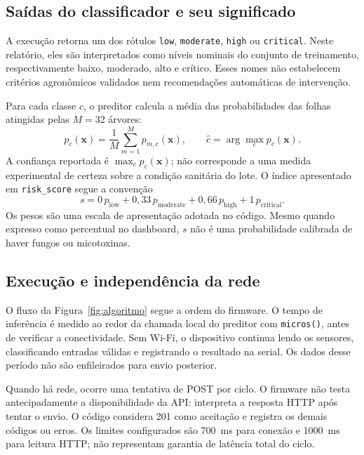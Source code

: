 \subsection{Saídas do classificador e seu significado}

A execução retorna um dos rótulos \texttt{low}, \texttt{moderate},
\texttt{high} ou \texttt{critical}. Neste relatório, eles são
interpretados como níveis nominais do conjunto de treinamento,
respectivamente baixo, moderado, alto e crítico.
Esses nomes não estabelecem critérios agronômicos validados nem
recomendações automáticas de intervenção.

Para cada classe $c$, o preditor calcula a média das probabilidades
das folhas atingidas pelas $M=32$ árvores:
\begin{equation}
p_c(\mathbf{x})=\frac{1}{M}\sum_{m=1}^{M}p_{m,c}(\mathbf{x}),
\qquad
\widehat{c}=\arg\max_c p_c(\mathbf{x}).
\end{equation}
A confiança reportada é $\max_c p_c(\mathbf{x})$; não corresponde a
uma medida experimental de certeza sobre a condição sanitária do lote.
O índice apresentado em \texttt{risk\_score} segue a convenção
\begin{equation}
s=0\,p_{\mathrm{low}}+0{,}33\,p_{\mathrm{moderate}}
+0{,}66\,p_{\mathrm{high}}+1\,p_{\mathrm{critical}}.
\label{eq:score}
\end{equation}
Os pesos são uma escala de apresentação adotada no código. Mesmo
quando expresso como percentual no dashboard, $s$ não é uma
probabilidade calibrada de haver fungos ou micotoxinas.

\subsection{Execução e independência da rede}

O fluxo da Figura~\ref{fig:algoritmo} segue a ordem do firmware.
O tempo de inferência é medido ao redor da chamada local do preditor
com \texttt{micros()}, antes de verificar a conectividade.
Sem Wi-Fi, o dispositivo continua lendo os sensores, classificando
entradas válidas e registrando o resultado na serial. Os dados
desse período não são enfileirados para envio posterior.

Quando há rede, ocorre uma tentativa de POST por ciclo. O firmware
não testa antecipadamente a disponibilidade da API: interpreta a
resposta HTTP após tentar o envio. O código considera 201 como
aceitação e registra os demais códigos ou erros. Os limites
configurados são 700~ms para conexão e 1000~ms para leitura HTTP;
não representam garantia de latência total do ciclo.

